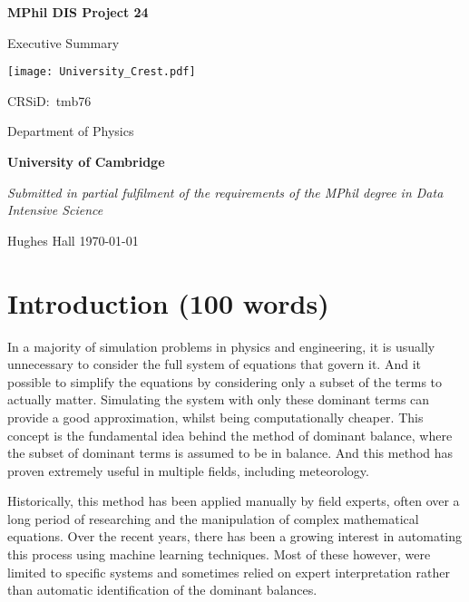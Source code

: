 \documentclass[12pt]{report} %
\begin{document}
\begin{titlepage}
	\centering
	{\LARGE\bfseries MPhil DIS Project 24\par}
	{\LARGE Executive Summary\par}
	\vspace{1cm}
	{\texttt{[image: University\_Crest.pdf]}\par}
	{\Large CRSiD:\ tmb76\par}
	\vspace{1cm}
	{\Large Department of Physics\par}
	{\Large\bfseries University of Cambridge\par}
	\vfill
	{\itshape Submitted in partial fulfilment of the requirements of the MPhil degree in Data Intensive Science}
	\vfill
	{\large Hughes Hall  \hspace{6cm} \today\par}
\end{titlepage}


\tableofcontents


\section{Introduction (100 words)}


In a majority of simulation problems in physics and engineering, it is usually unnecessary to consider the full system of equations that govern it. And it possible to simplify the equations by considering only a subset of the terms to actually matter. Simulating the system with only these dominant terms can provide a good approximation, whilst being computationally cheaper. This concept is the fundamental idea behind the method of dominant balance, where the subset of dominant terms is assumed to be in balance. And this method has proven extremely useful in multiple fields, including meteorology\cite{charney1947dynamics, phillips1963geostrophic, burger1958scale, yano2009scale}.

\vspace{5mm}

Historically, this method has been applied manually by field experts, often over a long period of researching and the manipulation of complex mathematical equations. Over the recent years, there has been a growing interest in automating this process using machine learning techniques. Most of these however, were limited to specific systems and sometimes relied on expert interpretation rather than automatic identification of the dominant balances\cite{ortwood2016robust,lee2018detection,sonnewald2019unsupervised}.
\end{document}
